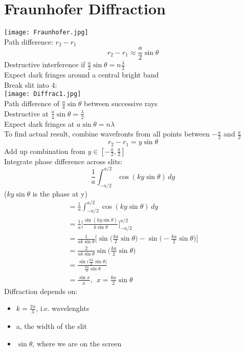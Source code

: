\documentclass[a4paper, 11pt, fleqn, normalem]{report}
\begin{document}
\section{Fraunhofer Diffraction}
\texttt{[image: Fraunhofer.jpg]} \\
Path difference: $r_{2} - r_{1}$
\begin{equation*}
    r_{2} - r_{1} \approx \frac{a}{2}\sin{\theta}
\end{equation*}
Destructive interference if $\frac{a}{2}\sin{\theta} = n\frac{\lambda}{2}$ \\
Expect dark fringes around a central bright band \\
Break slit into 4: \\
\texttt{[image: Diffrac1.jpg]} \\
Path difference of $\frac{a}{4}\sin{\theta}$ between successive rays \\
Destructive at $\frac{a}{4}\sin{\theta} = \frac{\lambda}{2}$ \\
Expect dark fringes at $a\sin{\theta} = n\lambda$ \\
To find actual result, combine wavefronts from all points between $-\frac{a}{2}$ and $\frac{a}{2}$
\begin{equation*}
    r_{2} - r_{1} = y\sin{\theta}
\end{equation*}
Add up combination from $y \in {[{-\frac{a}{2}},\frac{a}{2}]}$ \\
Integrate phase difference across slits:
\begin{equation*}
    \frac{1}{a} \int_{-a/2}^{a/2} \cos{(ky\sin{\theta})}\,dy
\end{equation*}
($ky\sin{\theta}$ is the phase at y)
\begin{gather*}
    = \frac{1}{a} \int_{-a/2}^{a/2} \cos{(ky\sin{\theta})}\,dy \\
    = \frac{1}{a} \Big[\frac{\sin{(ky\sin{\theta})}}{k\sin{\theta}}\Big]^{a/2}_{-a/2} \\
    = \frac{1}{ak\sin{\theta}} \Big[\sin{\Big(\frac{ka}{2}\sin{\theta}\Big)} - \sin{\Big(-\frac{ka}{2}\sin{\theta}\Big)}\Big] \\
    = \frac{2}{ak\sin{\theta}}\sin{\Big(\frac{ka}{2}\sin{\theta}\Big)} \\
    = \frac{\sin{\big(\tfrac{ka}{2}\sin{\theta}\big)}}{\tfrac{ka}{2}\sin{\theta}}\\
    = \frac{\sin{x}}{x},~~x = \frac{ka}{2}\sin{\theta}
\end{gather*}
Diffraction depends on:
\begin{itemize}
    \item[] $k = \frac{2\pi}{\lambda}$, i.e. wavelenghts
    \item[] a, the width of the slit
    \item[] $\sin{\theta}$, where we are on the screen
\end{itemize}
\end{document}
